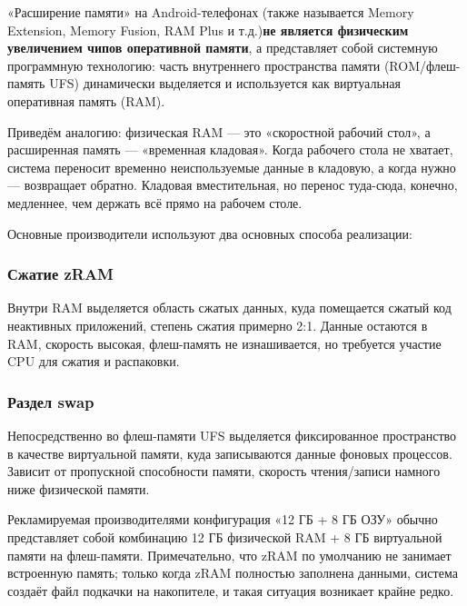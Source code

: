 


«Расширение памяти» на Android-телефонах (также называется Memory Extension, Memory Fusion, RAM Plus и т.д.)\textbf{не является физическим увеличением чипов оперативной памяти}, а представляет собой системную программную технологию: часть внутреннего пространства памяти (ROM/флеш-память UFS) динамически выделяется и используется как виртуальная оперативная память (RAM).

Приведём аналогию: физическая RAM — это «скоростной рабочий стол», а расширенная память — «временная кладовая». Когда рабочего стола не хватает, система переносит временно неиспользуемые данные в кладовую, а когда нужно — возвращает обратно. Кладовая вместительная, но перенос туда-сюда, конечно, медленнее, чем держать всё прямо на рабочем столе.


Основные производители используют два основных способа реализации:

\subsubsection*{Сжатие zRAM}

Внутри RAM выделяется область сжатых данных, куда помещается сжатый код неактивных приложений, степень сжатия примерно 2:1. Данные остаются в RAM, скорость высокая, флеш-память не изнашивается, но требуется участие CPU для сжатия и распаковки.

\subsubsection*{Раздел swap}

Непосредственно во флеш-памяти UFS выделяется фиксированное пространство в качестве виртуальной памяти, куда записываются данные фоновых процессов. Зависит от пропускной способности памяти, скорость чтения/записи намного ниже физической памяти.

Рекламируемая производителями конфигурация «12 ГБ + 8 ГБ ОЗУ» обычно представляет собой комбинацию 12 ГБ физической RAM + 8 ГБ виртуальной памяти на флеш-памяти. Примечательно, что zRAM по умолчанию не занимает встроенную память; только когда zRAM полностью заполнена данными, система создаёт файл подкачки на накопителе, и такая ситуация возникает крайне редко.

